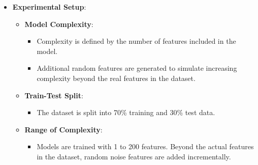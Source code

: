\documentclass[
  ignorenonframetext,
]{beamer}
\providecommand{\tightlist}{%
  \setlength{\itemsep}{0pt}\setlength{\parskip}{0pt}}\usepackage{longtable,booktabs,array}
\begin{document}
\begin{frame}
\begin{itemize}
\tightlist
\item
  \textbf{Experimental Setup}:

  \begin{itemize}
  \tightlist
  \item
    \textbf{Model Complexity}:

    \begin{itemize}
    \tightlist
    \item
      Complexity is defined by the number of features included in the
      model.
    \item
      Additional random features are generated to simulate increasing
      complexity beyond the real features in the dataset.
    \end{itemize}
  \item
    \textbf{Train-Test Split}:

    \begin{itemize}
    \tightlist
    \item
      The dataset is split into 70\% training and 30\% test data.
    \end{itemize}
  \item
    \textbf{Range of Complexity}:

    \begin{itemize}
    \tightlist
    \item
      Models are trained with 1 to 200 features. Beyond the actual
      features in the dataset, random noise features are added
      incrementally.
    \end{itemize}
  \end{itemize}
\end{itemize}
\end{frame}
\end{document}
